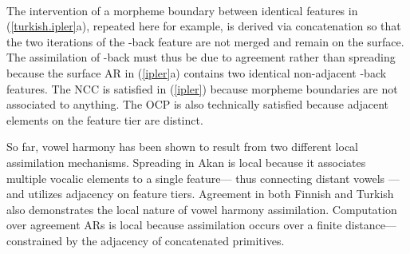 \documentclass[,doc,floatsintext]{apa6}
\theoremstyle{definition}
\theoremstyle{definition}
\theoremstyle{definition}
\theoremstyle{remark}
\begin{document}
\begin{exe}
\label{ipler} \\
\end{exe}

\noindent The intervention of a morpheme boundary between identical
features in (\ref{turkish.ipler}a), repeated here for example, is
derived via concatenation so that the two iterations of the -back
feature are not merged and remain on the surface. The assimilation of
-back must thus be due to agreement rather than spreading because the
surface AR in (\ref{ipler}a) contains two identical non-adjacent -back
features. The NCC is satisfied in (\ref{ipler}) because morpheme
boundaries are not associated to anything. The OCP is also technically
satisfied because adjacent elements on the feature tier are distinct.

So far, vowel harmony has been shown to result from two different local
assimilation mechanisms. Spreading in Akan is local because it
associates multiple vocalic elements to a single feature--- thus
connecting distant vowels ---and utilizes adjacency on feature tiers.
Agreement in both Finnish and Turkish also demonstrates the local nature
of vowel harmony assimilation. Computation over agreement ARs is local
because assimilation occurs over a finite distance--- constrained by the
adjacency of concatenated primitives.
\end{document}
